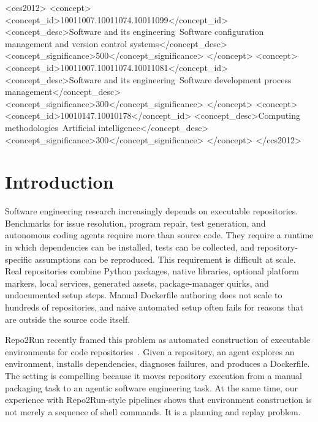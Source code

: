 \begin{CCSXML}
<ccs2012>
   <concept>
       <concept_id>10011007.10011074.10011099</concept_id>
       <concept_desc>Software and its engineering~Software configuration management and version control systems</concept_desc>
       <concept_significance>500</concept_significance>
       </concept>
   <concept>
       <concept_id>10011007.10011074.10011081</concept_id>
       <concept_desc>Software and its engineering~Software development process management</concept_desc>
       <concept_significance>300</concept_significance>
       </concept>
   <concept>
       <concept_id>10010147.10010178</concept_id>
       <concept_desc>Computing methodologies~Artificial intelligence</concept_desc>
       <concept_significance>300</concept_significance>
       </concept>
</ccs2012>
\end{CCSXML}



\maketitle

\section{Introduction}

Software engineering research increasingly depends on executable repositories.
Benchmarks for issue resolution, program repair, test generation, and autonomous coding agents require more than source code.
They require a runtime in which dependencies can be installed, tests can be collected, and repository-specific assumptions can be reproduced.
This requirement is difficult at scale.
Real repositories combine Python packages, native libraries, optional platform markers, local services, generated assets, package-manager quirks, and undocumented setup steps.
Manual Dockerfile authoring does not scale to hundreds of repositories, and naive automated setup often fails for reasons that are outside the source code itself.

Repo2Run recently framed this problem as automated construction of executable environments for code repositories~\cite{hu2025repo2run}.
Given a repository, an agent explores an environment, installs dependencies, diagnoses failures, and produces a Dockerfile.
The setting is compelling because it moves repository execution from a manual packaging task to an agentic software engineering task.
At the same time, our experience with Repo2Run-style pipelines shows that environment construction is not merely a sequence of shell commands.
It is a planning and replay problem.

